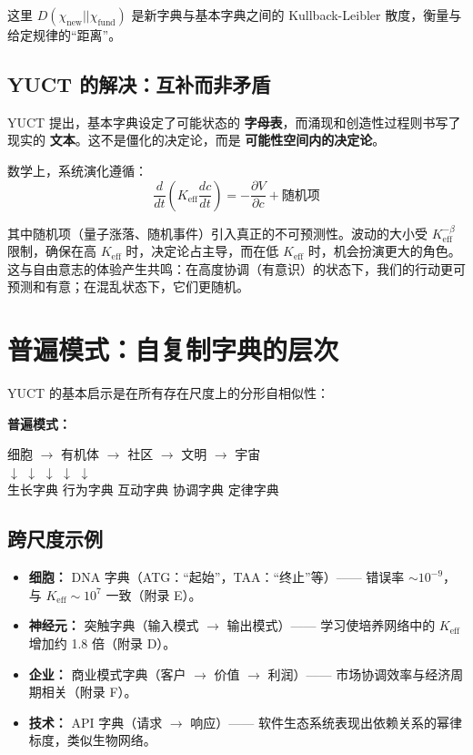 \documentclass[12pt,a4paper]{article}
\newcommand{\eff}{\mathrm{eff}}
\newcommand{\Ke}{K_{\eff}}
\begin{document}
	这里 $D(\chi_{\text{new}} || \chi_{\text{fund}})$ 是新字典与基本字典之间的 Kullback-Leibler 散度，衡量与给定规律的“距离”。
	
	\subsection{YUCT 的解决：互补而非矛盾}
	
	YUCT 提出，基本字典设定了可能状态的 \textbf{字母表}，而涌现和创造性过程则书写了现实的 \textbf{文本}。这不是僵化的决定论，而是 \textbf{可能性空间内的决定论}。
	
	数学上，系统演化遵循：
	\[
	\frac{d}{dt}\left( \Ke \frac{dc}{dt} \right) = -\frac{\partial V}{\partial c} + \text{随机项}
	\]
	
	其中随机项（量子涨落、随机事件）引入真正的不可预测性。波动的大小受 $\Ke^{-\beta}$ 限制，确保在高 $\Ke$ 时，决定论占主导，而在低 $\Ke$ 时，机会扮演更大的角色。这与自由意志的体验产生共鸣：在高度协调（有意识）的状态下，我们的行动更可预测和有意；在混乱状态下，它们更随机。
	
	\section{普遍模式：自复制字典的层次}
	
	YUCT 的基本启示是在所有存在尺度上的分形自相似性：
	
	\textbf{普遍模式：}
	\begin{center}
		细胞 $\to$ 有机体 $\to$ 社区 $\to$ 文明 $\to$ 宇宙\\
		$\downarrow$ \hspace{1cm} $\downarrow$ \hspace{1.2cm} $\downarrow$ \hspace{1.2cm} $\downarrow$ \hspace{1.2cm} $\downarrow$\\
		生长字典 \hspace{0.2cm} 行为字典 \hspace{0.1cm} 互动字典 \hspace{0.1cm} 协调字典 \hspace{0.1cm} 定律字典
	\end{center}
	
	\subsection{跨尺度示例}
	
	\begin{itemize}
		\item \textbf{细胞：} DNA 字典（ATG：“起始”，TAA：“终止”等）—— 错误率 $\sim 10^{-9}$，与 $\Ke \sim 10^7$ 一致（附录 E）。
		\item \textbf{神经元：} 突触字典（输入模式 $\to$ 输出模式）—— 学习使培养网络中的 $\Ke$ 增加约 1.8 倍（附录 D）。
		\item \textbf{企业：} 商业模式字典（客户 $\to$ 价值 $\to$ 利润）—— 市场协调效率与经济周期相关（附录 F）。
		\item \textbf{技术：} API 字典（请求 $\to$ 响应）—— 软件生态系统表现出依赖关系的幂律标度，类似生物网络。
	\end{itemize}
	
\end{document}
